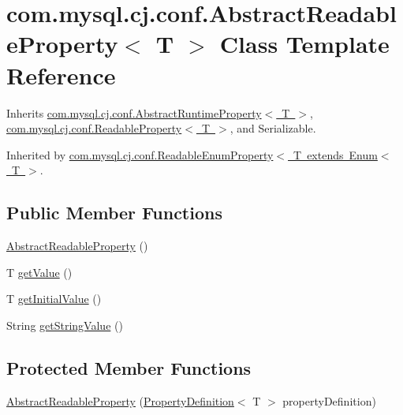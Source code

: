 \hypertarget{classcom_1_1mysql_1_1cj_1_1conf_1_1_abstract_readable_property}{}\section{com.\+mysql.\+cj.\+conf.\+Abstract\+Readable\+Property$<$ T $>$ Class Template Reference}
\label{classcom_1_1mysql_1_1cj_1_1conf_1_1_abstract_readable_property}


Inherits \mbox{\hyperlink{classcom_1_1mysql_1_1cj_1_1conf_1_1_abstract_runtime_property}{com.\+mysql.\+cj.\+conf.\+Abstract\+Runtime\+Property$<$ T $>$}}, \mbox{\hyperlink{interfacecom_1_1mysql_1_1cj_1_1conf_1_1_readable_property}{com.\+mysql.\+cj.\+conf.\+Readable\+Property$<$ T $>$}}, and Serializable.



Inherited by \mbox{\hyperlink{classcom_1_1mysql_1_1cj_1_1conf_1_1_readable_enum_property}{com.\+mysql.\+cj.\+conf.\+Readable\+Enum\+Property$<$ T extends Enum$<$ T $>$}}.

\subsection*{Public Member Functions}
\begin{DoxyCompactItemize}
\item 
\mbox{\hyperlink{classcom_1_1mysql_1_1cj_1_1conf_1_1_abstract_readable_property_ae3a296fb4c279421da0dcadde68e795b}{Abstract\+Readable\+Property}} ()
\item 
T \mbox{\hyperlink{classcom_1_1mysql_1_1cj_1_1conf_1_1_abstract_readable_property_abb381de77253efc91da51b518f28ed42}{get\+Value}} ()
\item 
T \mbox{\hyperlink{classcom_1_1mysql_1_1cj_1_1conf_1_1_abstract_readable_property_a8848d72c6bd0795fe6585242d546f050}{get\+Initial\+Value}} ()
\item 
String \mbox{\hyperlink{classcom_1_1mysql_1_1cj_1_1conf_1_1_abstract_readable_property_a2a7a4ec0038e77928d07df31a52e3e8a}{get\+String\+Value}} ()
\end{DoxyCompactItemize}
\subsection*{Protected Member Functions}
\begin{DoxyCompactItemize}
\item 
\mbox{\hyperlink{classcom_1_1mysql_1_1cj_1_1conf_1_1_abstract_readable_property_aed2615bd01d5d87e9e8847a6b43ec815}{Abstract\+Readable\+Property}} (\mbox{\hyperlink{interfacecom_1_1mysql_1_1cj_1_1conf_1_1_property_definition}{Property\+Definition}}$<$ T $>$ property\+Definition)
\end{DoxyCompactItemize}

